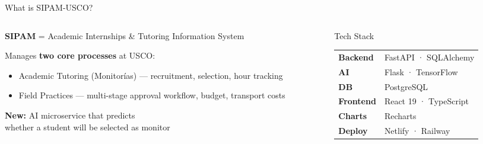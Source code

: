 \documentclass[aspectratio=169,12pt]{beamer}
\begin{document}
\begin{frame}{What is SIPAM-USCO?}
  \begin{columns}[T]
    \begin{column}{0.55\textwidth}
      \textbf{SIPAM} = Academic Internships \& Tutoring Information System
      \vspace{0.4cm}

      Manages \textbf{two core processes} at USCO:
      \begin{itemize}
        \item \alert{Academic Tutoring (Monitorías)} — recruitment, selection, hour tracking
        \item \alert{Field Practices} — multi-stage approval workflow, budget, transport costs
      \end{itemize}
      \vspace{0.4cm}

      \textbf{New:} AI microservice that predicts \\whether a student will be selected as monitor
    \end{column}
    \begin{column}{0.42\textwidth}
      \begin{block}{Tech Stack}
        \footnotesize
        \begin{tabular}{ll}
          \textbf{Backend}   & FastAPI · SQLAlchemy \\
          \textbf{AI}        & Flask · TensorFlow \\
          \textbf{DB}        & PostgreSQL \\
          \textbf{Frontend}  & React 19 · TypeScript \\
          \textbf{Charts}    & Recharts \\
          \textbf{Deploy}    & Netlify · Railway \\
        \end{tabular}
      \end{block}
    \end{column}
  \end{columns}
\end{frame}
\end{document}

